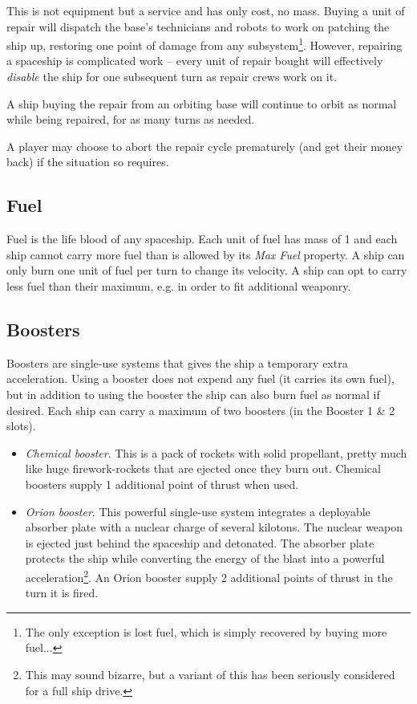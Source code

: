 \documentclass[a4paper,12pt,notitlepage,twocolumn]{article}
\begin{document}
This is not equipment but a service and has only cost, no mass. Buying
a unit of repair will dispatch the base's technicians and robots to
work on patching the ship up, restoring one point of damage from any subsystem\footnote{The
  only exception is lost fuel, which is simply recovered 
by buying more fuel...}. However, repairing a spaceship is complicated
work -- every unit of repair bought will effectively \emph{disable}
the ship for one subsequent turn as repair crews work on it. 

A ship buying the repair from an orbiting base will continue to orbit
as normal while being repaired, for as many turns as needed.

A player may choose to abort the repair cycle prematurely (and get their
money back) if the situation so requires. 

\subsection{Fuel}

Fuel is the life blood of any spaceship. Each unit of fuel has mass of
1 and each ship cannot carry more fuel than is allowed by its
\emph{Max Fuel} property. A ship can only burn one unit of fuel per
turn to change its velocity. A ship can opt to carry less fuel than
their maximum, e.g. in order to fit additional weaponry. 

\subsection{Boosters}

Boosters are single-use systems that gives the ship a temporary extra
acceleration. Using a booster does not expend any fuel (it carries its
own fuel), but in addition to using the booster the ship can also burn fuel
as normal if desired. Each ship can carry a maximum of two boosters (in the
Booster 1 \& 2 slots). 

\begin{itemize}
\item \emph{Chemical booster}. This is a pack of rockets with solid
  propellant, pretty much like huge firework-rockets that are ejected
  once they burn out. Chemical boosters supply 1 additional point of
  thrust when used. 
\item \emph{Orion booster}. This powerful single-use system integrates a
  deployable absorber plate with a nuclear charge of several kilotons. The
  nuclear weapon is ejected just behind the spaceship and
  detonated. The absorber plate protects the ship while converting the
  energy of the blast into a powerful acceleration\footnote{This may
    sound  bizarre, but a variant of this has been seriously
    considered for a full ship drive.}. An Orion booster supply 2
  additional points of thrust in the turn it is fired.  
\end{itemize}
\end{document}
